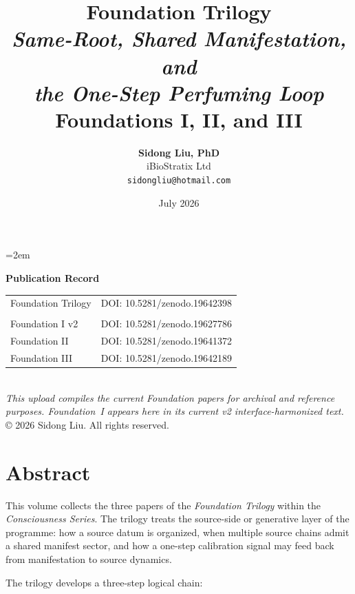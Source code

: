 \documentclass[12pt,a4paper,openany]{book}
\title{
  \vspace{-2cm}
  {\Huge\textbf{Foundation Trilogy}}\\[1cm]
  {\Large\textit{Same-Root, Shared Manifestation, and\\
  the One-Step Perfuming Loop}}\\[2cm]
  {\normalsize Foundations I, II, and III}
}
\author{
  \textbf{Sidong Liu, PhD}\\[0.5em]
  iBioStratix Ltd\\[0.3em]
  \texttt{sidongliu@hotmail.com}
}
\date{July 2026}
\begin{document}
\emergencystretch=2em
\raggedbottom
{}

\frontmatter
\maketitle

\newpage
\thispagestyle{empty}
\vspace*{\fill}
\begin{center}
\textbf{Publication Record}\\[2em]
\begin{tabular}{P{4.1cm}P{8.4cm}}
Foundation Trilogy & DOI: 10.5281/zenodo.19642398 \\
\\[-0.2em]
Foundation I v2 & DOI: 10.5281/zenodo.19627786 \\
Foundation II & DOI: 10.5281/zenodo.19641372 \\
Foundation III & DOI: 10.5281/zenodo.19642189 \\
\end{tabular}
\\[3em]
\textit{This upload compiles the current Foundation papers for
archival and reference purposes. Foundation~I appears here in its current
v2 interface-harmonized text.}
\\[2em]
\copyright{} 2026 Sidong Liu. All rights reserved.
\end{center}
\vspace*{\fill}

\chapter*{Abstract}

This volume collects the three papers of the \emph{Foundation Trilogy}
within the \emph{Consciousness Series}. The trilogy treats the
source-side or generative layer of the programme: how a source datum is
organized, when multiple source chains admit a shared manifest sector,
and how a one-step calibration signal may feed back from manifestation
to source dynamics.

The trilogy develops a three-step logical chain:
\end{document}
